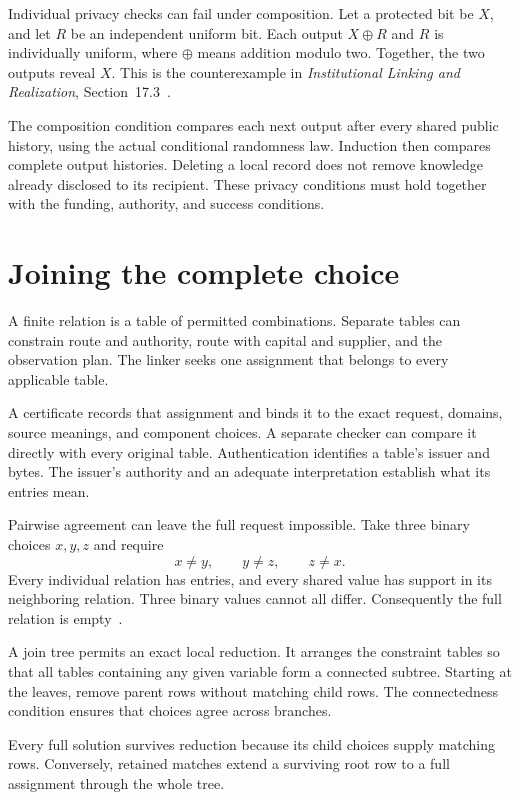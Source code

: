 \documentclass{momentum}
\begin{document}
Individual privacy checks can fail under composition.
Let a protected bit be $X$, and let $R$ be an independent uniform bit.
Each output $X\mathbin{\oplus}R$ and $R$ is individually uniform, where $\oplus$ means addition modulo two.
Together, the two outputs reveal $X$.
This is the counterexample in \emph{Institutional Linking and Realization}, Section~17.3~\cite{linking}.

The composition condition compares each next output after every shared public history, using the actual conditional randomness law.
Induction then compares complete output histories.
Deleting a local record does not remove knowledge already disclosed to its recipient. These privacy conditions must hold together with the funding, authority, and success conditions.

\section{Joining the complete choice}
\label{sec:joining}

A finite relation is a table of permitted combinations. Separate tables can constrain route and authority, route with capital and supplier, and the observation plan.
The linker seeks one assignment that belongs to every applicable table.

A certificate records that assignment and binds it to the exact request, domains, source meanings, and component choices.
A separate checker can compare it directly with every original table.
Authentication identifies a table's issuer and bytes.
The issuer's authority and an adequate interpretation establish what its entries mean.

Pairwise agreement can leave the full request impossible.
Take three binary choices $x,y,z$ and require
\[
x\ne y,\qquad y\ne z,\qquad z\ne x.
\]
Every individual relation has entries, and every shared value has support in its neighboring relation.
Three binary values cannot all differ.
Consequently the full relation is empty~\cite[Section~4]{linking}.

A join tree permits an exact local reduction.
It arranges the constraint tables so that all tables containing any given variable form a connected subtree.
Starting at the leaves, remove parent rows without matching child rows.
The connectedness condition ensures that choices agree across branches.

Every full solution survives reduction because its child choices supply matching rows.
Conversely, retained matches extend a surviving root row to a full assignment through the whole tree.
\end{document}
